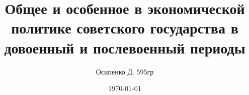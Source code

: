\documentclass[a4paper, 12pt]{article}
\title{Общее и особенное в экономической политике советского государства в довоенный и послевоенный периоды}
\author{Осипенко Д. 595гр}
\date{\today}
\begin{document}
\sffamily
\maketitle
\end{document}
